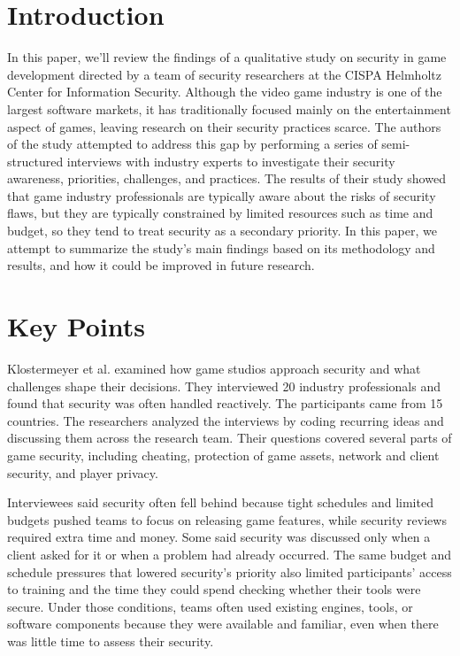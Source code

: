\documentclass[conference]{IEEEtran}
\begin{document}
\maketitle

\section{Introduction}
In this paper, we’ll review the findings of a qualitative study on security in game development directed by a team of security researchers at the CISPA Helmholtz Center for Information Security. Although the video game industry is one of the largest software markets, it has traditionally focused mainly on the entertainment aspect of games, leaving research on their security practices scarce. The authors of the study attempted to address this gap by performing a series of semi-structured interviews with industry experts to investigate their security awareness, priorities, challenges, and practices. The results of their study showed that game industry professionals are typically aware about the risks of security flaws, but they are typically constrained by limited resources such as time and budget, so they tend to treat security as a secondary priority. In this paper, we attempt to summarize the study’s main findings based on its methodology and results, and how it could be improved in future research.

\section{Key Points}
Klostermeyer et al. examined how game studios approach security and what challenges shape their decisions. They interviewed 20 industry professionals and found that security was often handled reactively. The participants came from 15 countries. The researchers analyzed the interviews by coding recurring ideas and discussing them across the research team. Their questions covered several parts of game security, including cheating, protection of game assets, network and client security, and player privacy.

Interviewees said security often fell behind because tight schedules and limited budgets pushed teams to focus on releasing game features, while security reviews required extra time and money. Some said security was discussed only when a client asked for it or when a problem had already occurred. The same budget and schedule pressures that lowered security's priority also limited participants' access to training and the time they could spend checking whether their tools were secure. Under those conditions, teams often used existing engines, tools, or software components because they were available and familiar, even when there was little time to assess their security.
\end{document}
